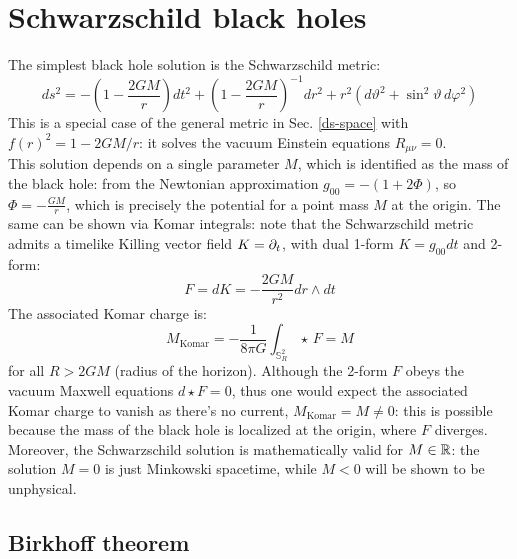 
\section{Schwarzschild black holes}

The simplest black hole solution is the Schwarzschild metric:
\begin{equation}
  ds^2 = - \left( 1 - \frac{2GM}{r} \right) dt^2 + \left( 1 - \frac{2GM}{r} \right)^{-1} dr^2 + r^2 \left( d\vartheta^2 + \sin^2 \vartheta\, d\varphi^2 \right)
  \label{eq:6.1}
\end{equation}
This is a special case of the general metric in Sec. \ref{ds-space} with $ f(r)^2 = 1 - 2GM / r $: it solves the vacuum Einstein equations $ R_{\mu \nu} = 0 $.\\
This solution depends on a single parameter $ M $, which is identified as the mass of the black hole: from the Newtonian approximation $ g_{00} = - (1 + 2\Phi) $, so $ \Phi = - \frac{GM}{r} $, which is precisely the potential for a point mass $ M $ at the origin. The same can be shown via Komar integrals: note that the Schwarzschild metric admits a timelike Killing vector field $ K = \partial_t $, with dual 1-form $ K = g_{00} dt $ and 2-form:
\begin{equation*}
  F = dK = - \frac{2GM}{r^2} dr \wedge dt
\end{equation*}
The associated Komar charge is:
\begin{equation*}
  M_{\text{Komar}} = - \frac{1}{8\pi G} \int_{\mathbb{S}^2_R} \star\, F = M
\end{equation*}
for all $ R > 2GM $ (radius of the horizon). Although the 2-form $ F $ obeys the vacuum Maxwell equations $ d\star F = 0 $, thus one would expect the associated Komar charge to vanish as there's no current, $ M_{\text{Komar}} = M \neq 0 $: this is possible because the mass of the black hole is localized at the origin, where $ F $ diverges. Moreover, the Schwarzschild solution is mathematically valid for $ M \in \mathbb{R} $: the solution $ M = 0 $ is just Minkowski spacetime, while $ M < 0 $ will be shown to be unphysical.

\subsection{Birkhoff theorem}

